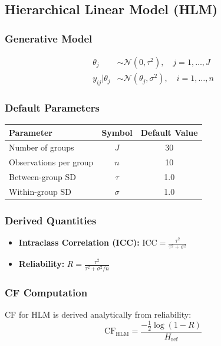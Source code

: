 \documentclass[10pt]{article} %
\theoremstyle{plain}
\theoremstyle{definition}
\newcommand{\CF}{\mathrm{CF}}
\newcommand{\Ent}{H}
\begin{document}
\subsection{Hierarchical Linear Model (HLM)}

\subsubsection{Generative Model}

\begin{align}
\theta_j &\sim \mathcal{N}(0, \tau^2), \quad j = 1, \ldots, J \\
y_{ij} | \theta_j &\sim \mathcal{N}(\theta_j, \sigma^2), \quad i = 1, \ldots, n
\end{align}

\subsubsection{Default Parameters}

\begin{center}
\begin{tabular}{lcc}
\toprule
Parameter & Symbol & Default Value \\
\midrule
Number of groups & $J$ & 30 \\
Observations per group & $n$ & 10 \\
Between-group SD & $\tau$ & 1.0 \\
Within-group SD & $\sigma$ & 1.0 \\
\bottomrule
\end{tabular}
\end{center}

\subsubsection{Derived Quantities}

\begin{itemize}
\item \textbf{Intraclass Correlation (ICC):} $\text{ICC} = \frac{\tau^2}{\tau^2 + \sigma^2}$
\item \textbf{Reliability:} $R = \frac{\tau^2}{\tau^2 + \sigma^2/n}$
\end{itemize}

\subsubsection{CF Computation}

CF for HLM is derived analytically from reliability:
\begin{equation}
\CF_{\text{HLM}} = \frac{-\frac{1}{2}\log(1 - R)}{\Ent_{\text{ref}}}
\end{equation}
\end{document}
